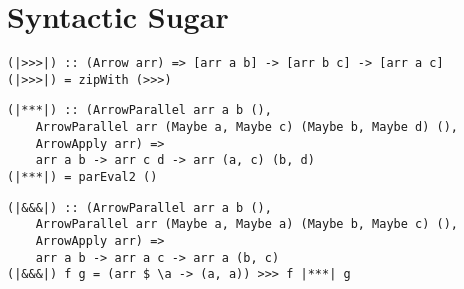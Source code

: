 \section{Syntactic Sugar}
\begin{lstlisting}[frame=htrbl]
(|>>>|) :: (Arrow arr) => [arr a b] -> [arr b c] -> [arr a c]
(|>>>|) = zipWith (>>>)
\end{lstlisting}

\begin{lstlisting}[frame=htrbl]
(|***|) :: (ArrowParallel arr a b (),
	ArrowParallel arr (Maybe a, Maybe c) (Maybe b, Maybe d) (),
	ArrowApply arr) =>
	arr a b -> arr c d -> arr (a, c) (b, d)
(|***|) = parEval2 ()
\end{lstlisting}

\begin{lstlisting}[frame=htrbl]
(|&&&|) :: (ArrowParallel arr a b (),
	ArrowParallel arr (Maybe a, Maybe a) (Maybe b, Maybe c) (),
	ArrowApply arr) =>
	arr a b -> arr a c -> arr a (b, c)
(|&&&|) f g = (arr $ \a -> (a, a)) >>> f |***| g
\end{lstlisting}